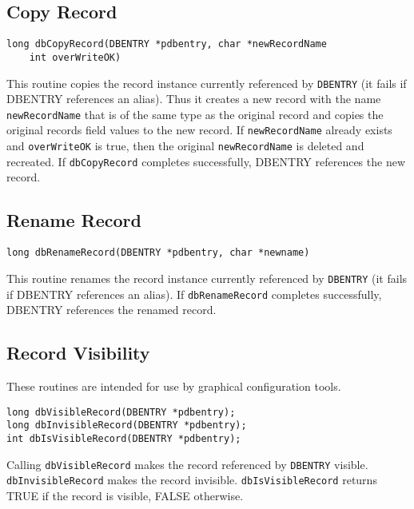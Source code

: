 \subsection{Copy Record}

\begin{verbatim}
long dbCopyRecord(DBENTRY *pdbentry, char *newRecordName
    int overWriteOK)
\end{verbatim}

This routine copies the record instance currently referenced by \verb|DBENTRY| (it fails if DBENTRY references an alias).
Thus it creates a new record with the name \verb|newRecordName| that is of the same type as the original record and copies the original records field values to the new record.
If \verb|newRecordName| already exists and \verb|overWriteOK| is true, then the original \verb|newRecordName| is deleted and recreated.
If \verb|dbCopyRecord| completes successfully, DBENTRY references the new record.

\subsection{Rename Record}

\begin{verbatim}
long dbRenameRecord(DBENTRY *pdbentry, char *newname)
\end{verbatim}

This routine renames the record instance currently referenced by \verb|DBENTRY| (it fails if DBENTRY references an alias).
If \verb|dbRenameRecord| completes successfully, DBENTRY references the renamed record.

\subsection{Record Visibility}

These routines are intended for use by graphical configuration tools.

\begin{verbatim}
long dbVisibleRecord(DBENTRY *pdbentry);
long dbInvisibleRecord(DBENTRY *pdbentry);
int dbIsVisibleRecord(DBENTRY *pdbentry);
\end{verbatim}

Calling \verb|dbVisibleRecord| makes the record referenced by \verb|DBENTRY| visible.
\verb|dbInvisibleRecord| makes the record invisible.
\verb|dbIsVisibleRecord| returns TRUE if the record is visible, FALSE otherwise.

